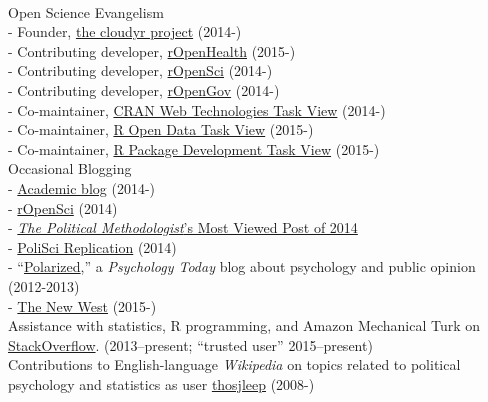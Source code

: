 \documentclass[12pt]{article}
\renewcommand{\section}[1]{\pagebreak[3]%
    \llap{\scshape\smash{\parbox[t]{\marginparwidth}{\raggedright {\color{lg}#1}}}}%
    \vspace{-\baselineskip}\par}
\newcommand{\topic}[1]{\pagebreak[3]\indent {\color{lg}{\footnotesize #1 }}\\}
\newcommand{\entry}[1]{\indent {\color{lg}\guillemotright}\hspace{2pt}#1\vspace{.25em}\\}
\newcommand{\subentry}[1]{{\color{lg}-} #1\vspace{.25em}\\}
\begin{document}
\topic{Public Engagement}
\entry{Open Science Evangelism}
\subentry{Founder, \href{http://cloudyr.github.io/}{the cloudyr project} (2014-)}
\subentry{Contributing developer, \href{http://ropensci.org/}{rOpenHealth} (2015-)}
\subentry{Contributing developer, \href{http://ropensci.org/}{rOpenSci} (2014-)}
\subentry{Contributing developer, \href{http://ropengov.github.io/}{rOpenGov} (2014-)}
\subentry{Co-maintainer, \href{http://cran.r-project.org/web/views/WebTechnologies.html}{CRAN Web Technologies Task View} (2014-)}
\subentry{Co-maintainer, \href{https://www.github.com/ropensci/opendata}{R Open Data Task View} (2015-)}
\subentry{Co-maintainer, \href{https://www.github.com/leeper/PackageDevelopment}{R Package Development Task View} (2015-)}
\entry{Occasional Blogging}
\subentry{\href{http://thomasleeper.com/blog}{Academic blog} (2014-)}
\subentry{\href{http://ropensci.org/blog/}{rOpenSci} (2014)}
\subentry{\href{http://thepoliticalmethodologist.com/2015/01/05/introducing-the-annual-tpm-most-viewed-post-award-and-our-2014-winner/}{\textit{The Political Methodologist}'s Most Viewed Post of 2014}}
\subentry{\href{http://politicalsciencereplication.wordpress.com/}{PoliSci Replication} (2014)}
\subentry{``\href{http://www.psychologytoday.com/blog/polarized}{Polarized},'' a {\em Psychology Today} blog about psychology and public opinion (2012-2013)}
\subentry{\href{https://thewpsa.wordpress.com/2015/05/09/what-can-we-learn-from-10-1-million-facebook-users-its-complicated/}{The New West} (2015-)}
\entry{Assistance with statistics, R programming, and Amazon Mechanical Turk on \href{http://stackoverflow.com/users/2338862/thomas}{StackOverflow}. (2013--present; ``trusted user'' 2015--present)}
\entry{Contributions to English-language {\em Wikipedia} on topics related to political psychology and statistics as user \href{http://en.wikipedia.org/wiki/Special:Contributions/Thosjleep}{thosjleep} (2008-)}

\end{document}
